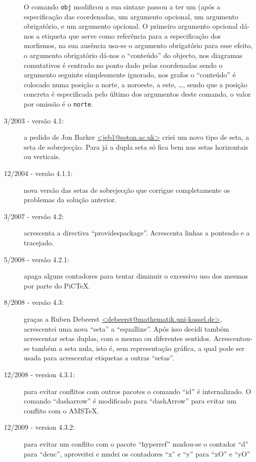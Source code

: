 \documentclass[a4paper,11pt]{article}
\begin{document}
\begin{description}
  O comando {\tt obj} modificou a sua sintaxe passou a ter um (após a
  especifica\c c\~ao das coordenadas, um argumento opcional, um argumento
  obrigat\'orio, e um argumento opcional. O primeiro argumento opcional
  d\'a-nos a etiqueta que serve como refer\^encia para a especifica\c c\~ao dos
  morfismos, na sua aus\^encia usa-se o argumento obrigat\'orio para esse
  efeito, o argumento obrigat\'orio d\'a-nos o ``conte\'udo'' do objecto, nos
  diagramas comutativos \'e centrado no ponto dado pelas coordenadas
  sendo o argumento seguinte simplesmente ignorado, nos grafos o
  ``conte\'udo'' \'e colocado numa posi\c c\~ao a norte, a noroeste, a este, \ldots,
  sendo que a posi\c c\~ao concreta \'e especificada pelo \'ultimo dos
  argumentos deste comando, o valor por omiss\~ao \'e o {\tt norte}.

\item[3/2003 - vers\~ao 4.1:] a pedido de Jon Barker \url{<jeb1@soton.ac.uk>}
  criei um novo tipo de seta, a seta de sobrejec\c c\~ao.  Para j\'a a dupla
  seta s\'o fica bem nas setas horizontais ou verticais.

\item[12/2004 - vers\~ao 4.1.1:] nova vers\~ao das setas de sobrejec\c c\~ao que
  corrigue completamente os problemas da solu\c c\~ao anterior.

\item[3/2007 - vers\~ao 4.2:] acrescenta a directiva
  ``providespackage''. Acrescenta linhas a ponteado e a tracejado.

\item[5/2008 - vers\~ao 4.2.1:] apaga alguns contadores para tentar
  diminuir o excessivo uso dos mesmos por parte do PiCTeX.

\item[8/2008 - vers\~ao 4.3:] gra\c cas a Ruben Debeerst
  \url{<debeerst@mathematik.uni-kassel.de>}, acrescentei uma nova
  ``seta'' a ``equalline''. Ap\'os isso decidi tamb\'em acrescentar
  setas duplas, com o mesmo ou diferentes sentidos. Acrescentou-se
  também a seta nula, isto é, sem representação gráfica, a qual pode
  ser usada para acrescentar etiquetas a outras ``setas''.

\item[12/2008 - version 4.3.1:] para evitar conflitos com outros
  pacotes o comando ``id'' \'e internalizado. O comando ``dasharrow'' \'e
  modificado para ``dashArrow'' para evitar um conflito com o AMSTeX.

\item[12/2009 - version 4.3.2:] para evitar um conflito com o pacote
  ``hyperref'' mudou-se o contador ``d'' para ``deuc'', aproveitei e 
  mudei os contadores ``x'' e ``y'' para ``xO'' e ``yO'' 


\end{description}
\end{document}
